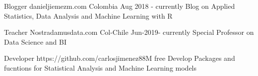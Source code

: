 

\begin{cventries}

  \cventry
    {Blogger} %
    {danieljiemezm.com} %
    {Colombia} %
    {Aug 2018 - currently } %
    {Blog on Applied Statistics, Data Analysis and Machine Learning with R}
    
   \cventry
   {Teacher}
   {Nostradamusdata.com}
   {Col-Chile}
   {Jun-2019- currently }
   {Special Professor on Data Science and BI}

  \cventry
   {Developer}
   {https://github.com/carlosjimenez88M}
   {free}
   {Develop Packages and fucntions for Statistical Analysis and Machine Learning models}

\end{cventries}
